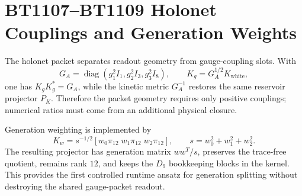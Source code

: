 \section{BT1107--BT1109 Holonet Couplings and Generation Weights}
\label{sec:bt1107-bt1109-holonet-coupling-generation-report}

The holonet packet separates readout geometry from gauge-coupling slots.  With
\[
G_A=\operatorname{diag}(g_1^2I_1,g_2^2I_3,g_3^2I_8),
\qquad
K_g=G_A^{1/2}K_{\mathrm{white}},
\]
one has $K_gK_g^*=G_A$, while the kinetic metric $G_A^{-1}$ restores the same reservoir projector $P_K$.  Therefore the packet geometry requires only positive couplings; numerical ratios must come from an additional physical closure.

Generation weighting is implemented by
\[
K_w=s^{-1/2}[w_0\pi_{12}\; w_1\pi_{12}\; w_2\pi_{12}],
\qquad
s=w_0^2+w_1^2+w_2^2.
\]
The resulting projector has generation matrix $ww^T/s$, preserves the trace-free quotient, remains rank $12$, and keeps the $D_9$ bookkeeping blocks in the kernel.  This provides the first controlled runtime ansatz for generation splitting without destroying the shared gauge-packet readout.
